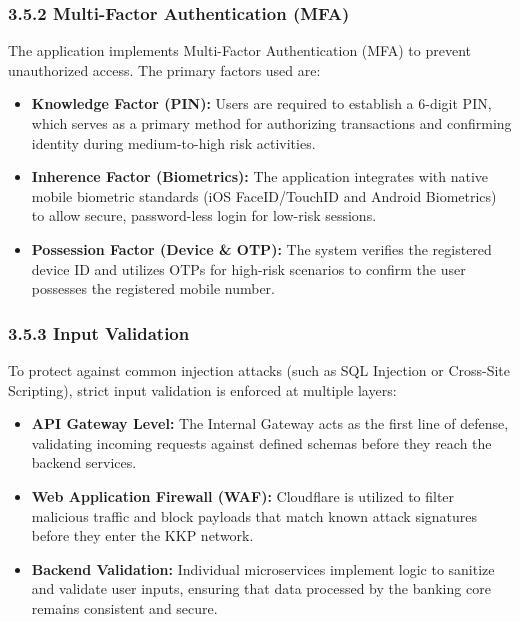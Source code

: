 \subsubsection{\texorpdfstring{\textbf{3.5.2 Multi-Factor Authentication
(MFA)}}{3.5.2 Multi-Factor Authentication (MFA)}}\label{multi-factor-authentication-mfa}

The application implements Multi-Factor Authentication (MFA) to prevent
unauthorized access. The primary factors used are:

\begin{itemize}
\item
  \textbf{Knowledge Factor (PIN):} Users are required to establish a
  6-digit PIN, which serves as a primary method for authorizing
  transactions and confirming identity during medium-to-high risk
  activities.
\item
  \textbf{Inherence Factor (Biometrics):} The application integrates
  with native mobile biometric standards (iOS FaceID/TouchID and Android
  Biometrics) to allow secure, password-less login for low-risk
  sessions.
\item
  \textbf{Possession Factor (Device \& OTP):} The system verifies the
  registered device ID and utilizes OTPs for high-risk scenarios to
  confirm the user possesses the registered mobile number.
\end{itemize}

\subsubsection{\texorpdfstring{\textbf{3.5.3 Input
Validation}}{3.5.3 Input Validation}}\label{input-validation}

To protect against common injection attacks (such as SQL Injection or
Cross-Site Scripting), strict input validation is enforced at multiple
layers:

\begin{itemize}
\item
  \textbf{API Gateway Level:} The Internal Gateway acts as the first
  line of defense, validating incoming requests against defined schemas
  before they reach the backend services.
\item
  \textbf{Web Application Firewall (WAF):} Cloudflare is utilized to
  filter malicious traffic and block payloads that match known attack
  signatures before they enter the KKP network.
\item
  \textbf{Backend Validation:} Individual microservices implement logic
  to sanitize and validate user inputs, ensuring that data processed by
  the banking core remains consistent and secure.
\end{itemize}

